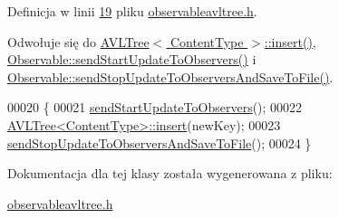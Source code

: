Definicja w linii \hyperlink{observableavltree_8h_source_l00019}{19} pliku \hyperlink{observableavltree_8h_source}{observableavltree.\-h}.



Odwołuje się do \hyperlink{avltree_8h_source_l00040}{A\-V\-L\-Tree$<$ Content\-Type $>$\-::insert()}, \hyperlink{observable_8h_source_l00023}{Observable\-::send\-Start\-Update\-To\-Observers()} i \hyperlink{observable_8h_source_l00034}{Observable\-::send\-Stop\-Update\-To\-Observers\-And\-Save\-To\-File()}.


\begin{DoxyCode}
00020         \{
00021                 \hyperlink{class_observable_a78df64057f152342a43f27979186a6ba}{sendStartUpdateToObservers}();
00022                         \hyperlink{class_a_v_l_tree_a3a85ff5f0b56af6c8b358611f8de95af}{AVLTree<ContentType>::insert}(newKey);
00023                 \hyperlink{class_observable_a2deff078096cccc4f2fb3293d1a3e8ff}{sendStopUpdateToObserversAndSaveToFile}();
00024         \}
\end{DoxyCode}


Dokumentacja dla tej klasy została wygenerowana z pliku\-:\begin{DoxyCompactItemize}
\item 
\hyperlink{observableavltree_8h}{observableavltree.\-h}\end{DoxyCompactItemize}

